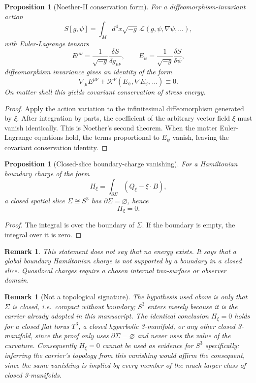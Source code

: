 \documentclass[11pt,a4paper]{article}
\newtheorem{proposition}[theorem]{Proposition}
\newtheorem{remark}[theorem]{Remark}
\begin{document}
\begin{proposition}[Noether-II conservation form]
For a diffeomorphism-invariant action
\[
S[g,\psi]=\int_M d^4x\sqrt{-g}\,\mathcal L(g,\psi,\nabla\psi,\ldots),
\]
with Euler-Lagrange tensors
\[
E^{\mu\nu}=\frac{1}{\sqrt{-g}}\frac{\delta S}{\delta g_{\mu\nu}},\qquad
E_\psi=\frac{1}{\sqrt{-g}}\frac{\delta S}{\delta\psi},
\]
diffeomorphism invariance gives an identity of the form
\[
\nabla_\mu E^{\mu\nu}+\mathcal K^\nu(E_\psi,\nabla E_\psi,\ldots)\equiv0.
\]
On matter shell this yields covariant conservation of stress energy.
\end{proposition}
\begin{proof}
Apply the action variation to the infinitesimal diffeomorphism generated by $\xi$.  After integration by parts, the coefficient of the arbitrary vector field $\xi$ must vanish identically.  This is Noether's second theorem.  When the matter Euler-Lagrange equations hold, the terms proportional to $E_\psi$ vanish, leaving the covariant conservation identity.\end{proof}

\begin{proposition}[Closed-slice boundary-charge vanishing]
For a Hamiltonian boundary charge of the form
\[
H_\xi=\int_{\partial\Sigma}(Q_\xi-\xi\cdot B),
\]
a closed spatial slice $\Sigma\cong S^3$ has $\partial\Sigma=\varnothing$, hence
\[
H_\xi=0.
\]
\end{proposition}
\begin{proof}
The integral is over the boundary of $\Sigma$.  If the boundary is empty, the integral over it is zero.\end{proof}

\begin{remark}
This statement does not say that no energy exists.  It says that a global boundary Hamiltonian charge is not supported by a boundary in a closed slice.  Quasilocal charges require a chosen internal two-surface or observer domain.
\end{remark}

\begin{remark}[Not a topological signature]
The hypothesis used above is only that $\Sigma$ is closed, i.e.\ compact without boundary; $S^3$ enters merely because it is the carrier already adopted in this manuscript.  The identical conclusion $H_\xi=0$ holds for a closed flat torus $T^3$, a closed hyperbolic 3-manifold, or any other closed 3-manifold, since the proof only uses $\partial\Sigma=\varnothing$ and never uses the value of the curvature.  Consequently $H_\xi=0$ cannot be used as evidence for $S^3$ specifically: inferring the carrier's topology from this vanishing would affirm the consequent, since the same vanishing is implied by every member of the much larger class of closed 3-manifolds.
\end{remark}
\end{document}
